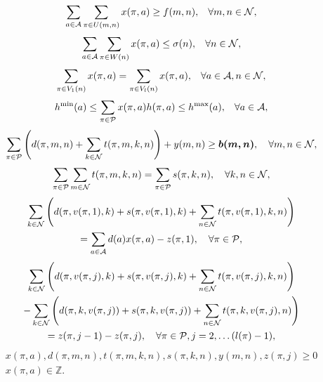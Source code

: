\begin{equation*}
\sum_{a\in {\cal A}} \sum_{\pi \in U(m,n)} x(\pi, a) \geq f(m,n), \hspace{3mm} \forall m,n \in {\cal N},
\end{equation*}
\begin{equation*}
\sum_{a\in {\cal A}} \sum_{\pi \in W(n)} x(\pi, a) \leq \sigma(n), \hspace{3mm} \forall  n \in {\cal N},
\end{equation*}
\begin{equation*}
\sum_{\pi \in V_1(n)} x(\pi, a) = \sum_{\pi \in V_l(n)} x(\pi, a), \hspace{3mm} \forall a\in {\cal A},  n \in {\cal N},
\end{equation*}
\begin{equation*}
h^{\text{min}}(a) \leq \sum_{\pi \in {\cal P}} x(\pi, a) h(\pi, a) \leq h^{\text{max}}(a), \hspace{3mm} \forall a\in {\cal A},
\end{equation*}
\begin{equation*}
\sum_{\pi \in {\cal P}} \left( d(\pi, m, n) + \sum_{k \in {\cal N}} t(\pi, m, k, n) \right) + y(m, n) \geq \mathbf{\boldsymbol{b(m, n)}}, \quad \forall m,n \in {\cal N},
\end{equation*}
\begin{equation*}
\sum_{\pi \in {\cal P}} \sum_{m \in {\cal N}} t(\pi, m, k, n) = \sum_{\pi \in {\cal P}} s(\pi, k, n), \quad \forall k, n \in {\cal N},
\end{equation*}
\begin{multline*}
\sum_{k \in {\cal N}} \left( d(\pi, v(\pi, 1), k) + s(\pi, v(\pi, 1), k) + \sum_{n\in {\cal N}} t(\pi, v(\pi, 1), k, n)\right)\\
 = \sum_{a\in {\cal A}} d(a) x(\pi, a) - z(\pi, 1), \quad \forall \pi \in {\cal P},
\end{multline*}
\begin{multline*}
\sum_{k \in {\cal N}} \left( d(\pi, v(\pi, j), k) + s(\pi, v(\pi, j), k) + \sum_{n\in {\cal N}} t(\pi, v(\pi, j), k, n)\right)\\
- \sum_{k\in {\cal N}} \left( d(\pi, k, v(\pi, j)) + s(\pi, k, v(\pi,j)) + \sum_{n\in {\cal N}} t(\pi, k, v(\pi,j), n) \right)\\
= z(\pi, j-1) - z(\pi, j), \quad \forall \pi \in {\cal P}, j=2, \ldots (l(\pi) - 1),
\end{multline*}
\begin{multline*}
x(\pi, a), d(\pi, m, n), t(\pi, m, k, n), s(\pi, k, n), y(m, n), z(\pi, j) \geq 0\\
x(\pi, a) \in {\mathbb Z}.
\end{multline*}





